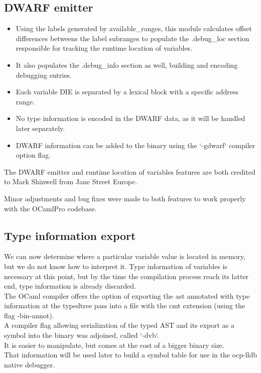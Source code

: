 \subsection{DWARF emitter}

\begin{itemize}
    \item Using the labels generated by available\_ranges, this module calculates offset differences
        betweens the label subranges to populate the .debug\_loc section responsible for
        tracking the runtime location of variables.
    \item It also populates the .debug\_info section as well, building and encoding
        debugging entries.
    \item Each variable DIE is separated by a lexical block with a specific address range.
    \item No type information is encoded in the DWARF data, as it will be handled later separately.
    \item DWARF information can be added to the binary using the `-gdwarf` compiler option flag.
\end{itemize}

The DWARF emitter and runtime location of variables features are both credited to
Mark Shinwell from Jane Street Europe.

Minor adjustments and bug fixes were made to both features to work properly with
the OCamlPro codebase.

\subsection{Type information export}

We can now determine where a particular variable value is located in memory, but
we do not know how to interpret it. Type information of variables is necessary
at this point, but by the time the compilation process reach its latter end,
type information is already discarded. \\

The OCaml compiler offers the option of exporting the \gls{ast} annotated with type
information at the typedtree pass into a file with the cmt extension (using the
flag -bin-annot). \\

A compiler flag allowing serialization of the typed AST and its export as a symbol
into the binary was adjoined, called `-dvb`.\\
It is easier to manipulate, but comes at the cost of a bigger binary
size.\\

That information will be used later to build a symbol table for use in the
ocp-lldb native debugger.

